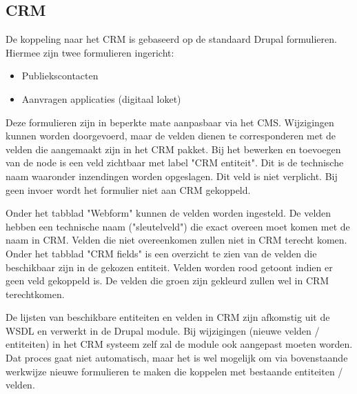 \subsection{CRM}

De koppeling naar het CRM is gebaseerd op de standaard Drupal formulieren. Hiermee zijn twee formulieren ingericht:
\begin{itemize}
\item Publiekscontacten
\item Aanvragen applicaties (digitaal loket)
\end{itemize}
Deze formulieren zijn in beperkte mate aanpasbaar via het CMS. Wijzigingen kunnen worden doorgevoerd, maar de velden dienen te corresponderen met de velden die aangemaakt zijn in het CRM pakket. Bij het bewerken en toevoegen van de node is een veld zichtbaar met label "CRM entiteit". Dit is de technische naam waaronder inzendingen worden opgeslagen. Dit veld is niet verplicht. Bij geen invoer wordt het formulier niet aan CRM gekoppeld.

Onder het tabblad "Webform" kunnen de velden worden ingesteld. De velden hebben een technische naam ("sleutelveld") die exact overeen moet komen met de naam in CRM. Velden die niet overeenkomen zullen niet in CRM terecht komen. Onder het tabblad "CRM fields" is een overzicht te zien van de velden die beschikbaar zijn in de gekozen entiteit. Velden worden rood getoont indien er geen veld gekoppeld is. De velden die groen zijn gekleurd zullen wel in CRM terechtkomen.

De lijsten van beschikbare entiteiten en velden in CRM zijn afkomstig uit de WSDL en verwerkt in de Drupal module. Bij wijzigingen (nieuwe velden / entiteiten) in het CRM systeem zelf zal de module ook aangepast moeten worden. Dat proces gaat niet automatisch, maar het is wel mogelijk om via bovenstaande werkwijze nieuwe formulieren te maken die koppelen met bestaande entiteiten / velden.
